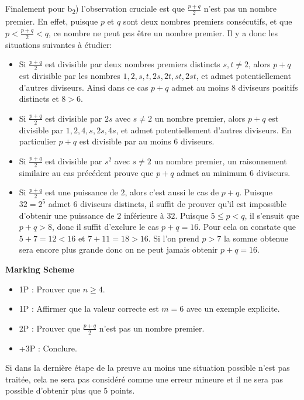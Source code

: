 {Finalement pour b\textsubscript{2}) l'observation cruciale est que $\frac{p+q}{2}$ n'est pas un nombre premier. En effet, puisque $p$ et $q$ sont deux nombres premiers consécutifs, et que $p < \frac{p+q}{2} < q$, ce nombre ne peut pas être un nombre premier. Il y a donc les situations suivantes à étudier:
\begin{itemize}
    \item Si $\frac{p+q}{2}$ est divisible par deux nombres premiers distincts $s, t \neq 2$, alors $p+q$ est divisible par les nombres $1, 2, s, t, 2s, 2t, st, 2st$, et admet potentiellement d'autres diviseurs. Ainsi dans ce cas $p+q$ admet au moins $8$ diviseurs positifs distincts et $8 > 6$.
    \item Si $\frac{p+q}{2}$ est divisible par $2s$ avec $s\neq 2$ un nombre premier, alors $p+q$ est divisible par $1, 2, 4, s, 2s, 4s$, et admet potentiellement d'autres diviseurs. En particulier $p+q$ est divisible par au moins $6$ diviseurs.
    \item Si $\frac{p+q}{2}$ est divisible par $s^2$ avec $s\neq 2$ un nombre premier, un raisonnement similaire au cas précédent prouve que $p+q$ admet au minimum $6$ diviseurs.
    \item Si $\frac{p+q}{2}$ est une puissance de $2$, alors c'est aussi le cas de $p+q$. Puisque $32 = 2^5$ admet $6$ diviseurs distincts, il suffit de prouver qu'il est impossible d'obtenir une puissance de $2$ inférieure à $32$. Puisque $5\leq p < q$, il s'ensuit que $p+q > 8$, donc il suffit d'exclure le cas $p+q = 16$. Pour cela on constate que $5+7 = 12 < 16$ et $7+11 = 18 > 16$. Si l'on prend $p > 7$ la somme obtenue sera encore plus grande donc on ne peut jamais obtenir $p+q = 16$.
\end{itemize}

\textbf{Marking Scheme}
\begin{itemize}
    \item 1P : Prouver que $n\geq 4$.
    \item 1P : Affirmer que la valeur correcte est $m=6$ avec un exemple explicite.
    \item 2P : Prouver que $\frac{p+q}{2}$ n'est pas un nombre premier.
    \item +3P : Conclure.
\end{itemize}

Si dans la dernière étape de la preuve au moins une situation possible n'est pas traitée, cela ne sera pas considéré comme une erreur mineure et il ne sera pas possible d'obtenir plus que 5 points.
}

